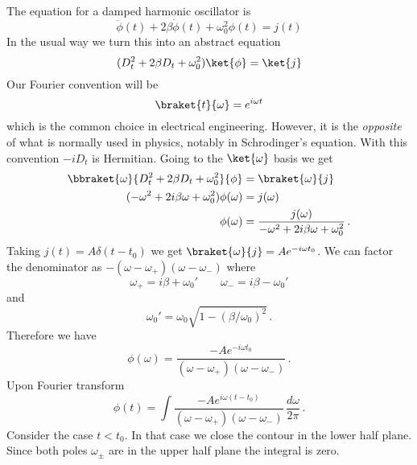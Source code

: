 
The equation for a damped harmonic oscillator is
\begin{equation}
  \ddot{\phi}(t)+2\beta\dot{\phi}(t)+\omega_{0}^{2}\phi(t)=j(t)
\end{equation}
In the usual way we turn this into an abstract equation \begin{equation}
(D_{t}^{2}+2\beta D_{t}+\omega_{0}^{2})\ket{\phi}=\ket{j} \end{equation}
Our Fourier convention will be
\begin{equation}
  \braket{t}{\omega}=e^{i\omega t}
\end{equation}
which is the common choice in electrical engineering.
However, it is the \emph{opposite} of what is normally used in physics, notably in Schrodinger's equation.
With this convention $-iD_t$ is Hermitian.
Going to the $\ket{\omega}$ basis we get
\begin{align}
  \bbraket{\omega}{D_t^2 + 2\beta D_t + \omega_0^2}{\phi} &= \braket{\omega}{j} \nonumber \\
  (-\omega^{2} + 2 i \beta\omega + \omega_{0}^{2}) \phi(\omega) & = j(\omega) \nonumber \\
  \phi(\omega) & = \frac{j(\omega)}{-\omega^{2} + 2 i \beta \omega + \omega_{0}^{2}}
  \, .
\end{align}
Taking $j(t)=A\delta(t-t_{0})$ we get $\braket{\omega}{j} = A e^{-i \omega t_{0}}$.
We can factor the denominator as $-(\omega-\omega_{+})(\omega-\omega_{-})$
where
\begin{equation}
  \omega_{+} = i \beta + \omega_0' \qquad \omega_{-} = i \beta - \omega_0' \label{eq:omega_plus_minus}
\end{equation}
and
\begin{equation}
  \omega_0' = \omega_0 \sqrt{ 1 - \left( \beta / \omega_0 \right) ^2 } \, .
\end{equation}
Therefore we have
\begin{equation}
  \phi(\omega) = \frac{-A e^{-i \omega t_0}}{(\omega - \omega_{+})(\omega-\omega_{-})} \, .
\end{equation}
Upon Fourier transform
\begin{equation}
  \phi(t) = 
  \int\frac{-Ae^{i \omega(t - t_0)}}{(\omega-\omega_{+})(\omega-\omega_{-})} \,
  \frac{d\omega}{2\pi} \, .
\end{equation}
Consider the case $t < t_0$.
In that case we close the contour in the lower half plane.
Since both poles $\omega_\pm$ are in the upper half plane the integral is zero.
